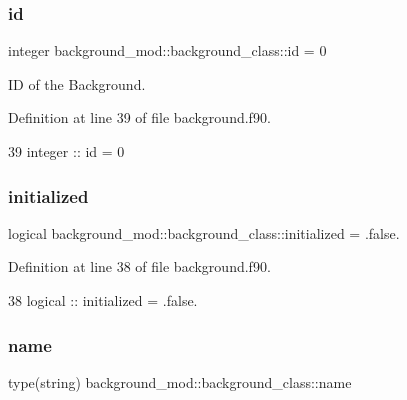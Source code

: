 \subsubsection{\texorpdfstring{id}{id}}
{\footnotesize\ttfamily integer background\+\_\+mod\+::background\+\_\+class\+::id = 0\hspace{0.3cm}{\ttfamily [private]}}



ID of the Background. 



Definition at line 39 of file background.\+f90.


\begin{DoxyCode}
39         \textcolor{keywordtype}{integer} :: id = 0
\end{DoxyCode}
\mbox{\label{structbackground__mod_1_1background__class_aeb3f1a195165888bc63066aed03d651b}} 
\subsubsection{\texorpdfstring{initialized}{initialized}}
{\footnotesize\ttfamily logical background\+\_\+mod\+::background\+\_\+class\+::initialized = .false.\hspace{0.3cm}{\ttfamily [private]}}



Definition at line 38 of file background.\+f90.


\begin{DoxyCode}
38         \textcolor{keywordtype}{logical} :: initialized = .false.
\end{DoxyCode}
\mbox{\label{structbackground__mod_1_1background__class_a4f812fd2adfe5d1e50db63e75e460022}} 
\subsubsection{\texorpdfstring{name}{name}}
{\footnotesize\ttfamily type(string) background\+\_\+mod\+::background\+\_\+class\+::name\hspace{0.3cm}{\ttfamily [private]}}



